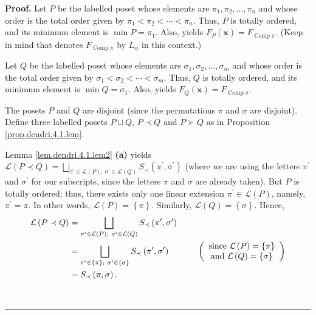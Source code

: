 \documentclass[numbers=enddot,12pt,final,onecolumn,notitlepage]{scrartcl}%
\theoremstyle{definition}
\newenvironment{proof}[1][Proof]{\noindent\textbf{#1.} }{\ \rule{0.5em}{0.5em}}
\newenvironment{verlong}{}{}
\begin{document}
\begin{verlong}
\begin{proof}
Let $P$ be the labelled poset whose elements are $\pi_{1},\pi_{2},\ldots
,\pi_{n}$ and whose order is the total order given by $\pi_{1}<\pi_{2}%
<\cdots<\pi_{n}$. Thus, $P$ is totally ordered, and its minimum element is
$\min P=\pi_{1}$. Also, \cite[Proposition 5.2.10]{HopfComb} yields
$F_{P}\left(  \mathbf{x}\right)  =F_{\operatorname*{Comp}\pi}$. (Keep in mind
that \cite[Proposition 5.2.10]{HopfComb} denotes $F_{\operatorname*{Comp}\pi}$
by $L_{\alpha}$ in this context.)

Let $Q$ be the labelled poset whose elements are $\sigma_{1},\sigma_{2}%
,\ldots,\sigma_{m}$ and whose order is the total order given by $\sigma
_{1}<\sigma_{2}<\cdots<\sigma_{m}$. Thus, $Q$ is totally ordered, and its
minimum element is $\min Q=\sigma_{1}$. Also, \cite[Proposition 5.2.10]%
{HopfComb} yields $F_{Q}\left(  \mathbf{x}\right)  =F_{\operatorname*{Comp}%
\sigma}$.

The posets $P$ and $Q$ are disjoint (since the permutations $\pi$ and $\sigma$
are disjoint). Define three labelled posets $P\sqcup Q$, $P\left.
\prec\right.  Q$ and $P\left.  \succ\right.  Q$ as in Proposition
\ref{prop.dendri.4.1.lem}.

Lemma \ref{lem.dendri.4.1.lem2} \textbf{(a)} yields $\mathcal{L}\left(
P\left.  \prec\right.  Q\right)  =\bigsqcup_{\pi^{\prime}\in\mathcal{L}\left(
P\right)  ;\ \sigma^{\prime}\in\mathcal{L}\left(  Q\right)  }S_{\prec}\left(
\pi^{\prime},\sigma^{\prime}\right)  $ (where we are using the letters
$\pi^{\prime}$ and $\sigma^{\prime}$ for our subscripts, since the letters
$\pi$ and $\sigma$ are already taken). But $P$ is totally ordered; thus, there
exists only one linear extension $\pi^{\prime}\in\mathcal{L}\left(  P\right)
$, namely, $\pi^{\prime}=\pi$. In other words, $\mathcal{L}\left(  P\right)
=\left\{  \pi\right\}  $. Similarly, $\mathcal{L}\left(  Q\right)  =\left\{
\sigma\right\}  $. Hence,%
\begin{align}
\mathcal{L}\left(  P\left.  \prec\right.  Q\right)    & =\bigsqcup
_{\pi^{\prime}\in\mathcal{L}\left(  P\right)  ;\ \sigma^{\prime}\in
\mathcal{L}\left(  Q\right)  }S_{\prec}\left(  \pi^{\prime},\sigma^{\prime
}\right) \nonumber\\
&  =\bigsqcup_{\pi^{\prime}\in\left\{  \pi\right\}  ;\ \sigma^{\prime
}\in\left\{  \sigma\right\}  }S_{\prec}\left(  \pi^{\prime},\sigma^{\prime
}\right)  \ \ \ \ \ \ \ \ \ \ \left(
\begin{array}
[c]{c}%
\text{since }\mathcal{L}\left(  P\right)  =\left\{  \pi\right\}  \\
\text{and }\mathcal{L}\left(  Q\right)  =\left\{  \sigma\right\}
\end{array}
\right)  \nonumber\\
& =S_{\prec}\left(  \pi,\sigma\right)  .\label{pf.cor.dendri.4.1.L1}%
\end{align}



\end{proof}
\end{verlong}
\end{document}

